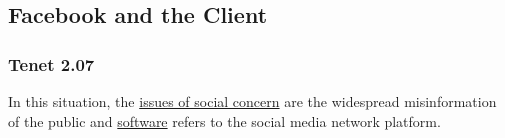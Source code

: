 
\subsection{Facebook and the Client}

\subsubsection{Tenet 2.07}




In this situation, the \ul{issues of social concern} are the widespread misinformation of the public and \ul{software} refers to the social media network platform.

